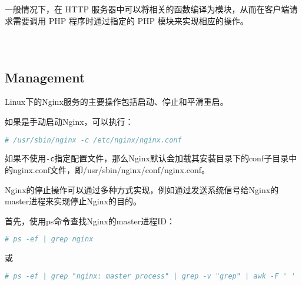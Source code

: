 一般情况下，在 HTTP 服务器中可以将相关的函数编译为模块，从而在客户端请求需要调用 PHP 程序时通过指定的 PHP 模块来实现相应的操作。





\begin{lstlisting}[language=bash]

\end{lstlisting}




\begin{lstlisting}[language=bash]

\end{lstlisting}




\begin{lstlisting}[language=bash]

\end{lstlisting}











\subsection{Management}



Linux下的Nginx服务的主要操作包括启动、停止和平滑重启。

如果是手动启动Nginx，可以执行：

\begin{lstlisting}[language=bash]
# /usr/sbin/nginx -c /etc/nginx/nginx.conf
\end{lstlisting}

如果不使用\texttt{-c}指定配置文件，那么Nginx默认会加载其安装目录下的conf子目录中的nginx.conf文件，即/usr/sbin/nginx/conf/nginx.conf。

Nginx的停止操作可以通过多种方式实现，例如通过发送系统信号给Nginx的master进程来实现停止Nginx的目的。

首先，使用ps命令查找Nginx的master进程ID：

\begin{lstlisting}[language=bash]
# ps -ef | grep nginx 
\end{lstlisting}

或


\begin{lstlisting}[language=bash]
# ps -ef | grep "nginx: master process" | grep -v "grep" | awk -F ' ' '{print $2}'
\end{lstlisting}




